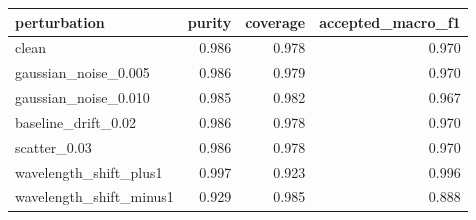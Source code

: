 \begin{tabular}{lrrr}
\toprule
perturbation & purity & coverage & accepted_macro_f1 \\
\midrule
clean & 0.986 & 0.978 & 0.970 \\
gaussian_noise_0.005 & 0.986 & 0.979 & 0.970 \\
gaussian_noise_0.010 & 0.985 & 0.982 & 0.967 \\
baseline_drift_0.02 & 0.986 & 0.978 & 0.970 \\
scatter_0.03 & 0.986 & 0.978 & 0.970 \\
wavelength_shift_plus1 & 0.997 & 0.923 & 0.996 \\
wavelength_shift_minus1 & 0.929 & 0.985 & 0.888 \\
\bottomrule
\end{tabular}
